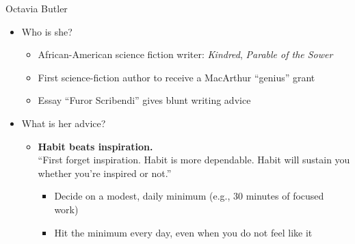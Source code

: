 \documentclass[aspectratio=169]{beamer}
\begin{document}
\begin{frame}{Octavia Butler}
  \begin{itemize}
  \item Who is she?
    \begin{itemize}
    \item African-American science fiction writer: \emph{Kindred}, \emph{Parable of the Sower}
    \item First science-fiction author to receive a MacArthur ``genius'' grant
    \item Essay ``Furor Scribendi'' gives blunt writing advice \citep{butler:furor-scribendi}
  \end{itemize}
\item What is her advice?
  \begin{itemize}
    \item \textbf{Habit beats inspiration.}\\
      ``First forget inspiration. Habit is more dependable. Habit will sustain you whether you're inspired or not.'' \citep[p.~141]{butler:furor-scribendi}
      \begin{itemize}
        \item Decide on a modest, daily minimum (e.g., 30 minutes of focused work)
        \item Hit the minimum every day, even when you do not feel like it
      \end{itemize}
  \end{itemize}
\end{itemize}
\end{frame}

\end{document}
